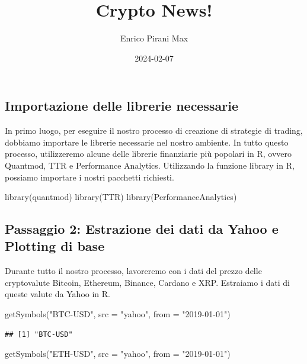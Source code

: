 \documentclass[]{tufte-handout}
\title[Una Newsletter sull'andamento delle crypto]{Crypto News!}
\author{Enrico Pirani Max}
\date{2024-02-07}
\newenvironment{Shaded}{}{}
\newcommand{\AttributeTok}[1]{\textcolor[rgb]{0.49,0.56,0.16}{#1}}
\newcommand{\FunctionTok}[1]{\textcolor[rgb]{0.02,0.16,0.49}{#1}}
\newcommand{\NormalTok}[1]{#1}
\newcommand{\StringTok}[1]{\textcolor[rgb]{0.25,0.44,0.63}{#1}}
\begin{document}
\maketitle




\subsection{Importazione delle librerie
necessarie}\label{importazione-delle-librerie-necessarie}

In primo luogo, per eseguire il nostro processo di creazione di
strategie di trading, dobbiamo importare le librerie necessarie nel
nostro ambiente. In tutto questo processo, utilizzeremo alcune delle
librerie finanziarie più popolari in R, ovvero Quantmod, TTR e
Performance Analytics. Utilizzando la funzione library in R, possiamo
importare i nostri pacchetti richiesti.

\begin{Shaded}
\begin{Highlighting}[]
\FunctionTok{library}\NormalTok{(quantmod)}
\FunctionTok{library}\NormalTok{(TTR)}
\FunctionTok{library}\NormalTok{(PerformanceAnalytics)}
\end{Highlighting}
\end{Shaded}

\subsection{Passaggio 2: Estrazione dei dati da Yahoo e Plotting di
base}\label{passaggio-2-estrazione-dei-dati-da-yahoo-e-plotting-di-base}

Durante tutto il nostro processo, lavoreremo con i dati del prezzo delle
cryptovalute Bitcoin, Ethereum, Binance, Cardano e XRP. Estraiamo i dati
di queste valute da Yahoo in R.

\begin{Shaded}
\begin{Highlighting}[]
\FunctionTok{getSymbols}\NormalTok{(}\StringTok{"BTC{-}USD"}\NormalTok{, }\AttributeTok{src =} \StringTok{"yahoo"}\NormalTok{, }\AttributeTok{from =} \StringTok{"2019{-}01{-}01"}\NormalTok{)}
\end{Highlighting}
\end{Shaded}

\begin{verbatim}
## [1] "BTC-USD"
\end{verbatim}

\begin{Shaded}
\begin{Highlighting}[]
\FunctionTok{getSymbols}\NormalTok{(}\StringTok{"ETH{-}USD"}\NormalTok{, }\AttributeTok{src =} \StringTok{"yahoo"}\NormalTok{, }\AttributeTok{from =} \StringTok{"2019{-}01{-}01"}\NormalTok{)}
\end{Highlighting}
\end{Shaded}
\end{document}
